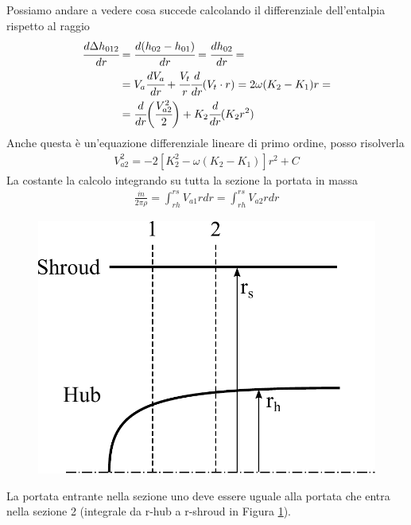 Possiamo andare a vedere cosa succede calcolando il differenziale dell'entalpia rispetto al raggio
\begin{align*}
\begin{split}
\cfrac{d \Delta h_{012}}{dr} &= \cfrac{d ( h_{02}-h_{01})}{dr} = \cfrac{dh_{02}}{dr} = \\
&= V_a \cfrac{dV_a}{dr} + \cfrac{V_t}{r} \cfrac{d}{dr} (V_t \cdot r) = 2 \omega (K_2 - K_1) r = \\
&= \cfrac{d}{dr} \bigg( \cfrac{V_{a2}^2}{2} \bigg) + K_2 \cfrac{d}{dr} (K_2 r^2)
\end{split}
\end{align*}
Anche questa è un'equazione differenziale lineare di primo ordine, posso risolverla
\begin{align*}
V_{a2}^2 = -2 \left[ K_2^2 - \omega \left( K_2 - K_1 \right) \right] r^2 + C
\end{align*}
La costante la calcolo integrando su tutta la sezione la portata in massa
\begin{align*}
\frac{\dot{m}}{2 \pi \rho} = \int_{rh}^{rs} V_{a1} r dr = \int_{rh}^{rs} V_{a2} r dr
\end{align*}
\begin{figure}[h]
\centering
  \includegraphics[width=.4\textwidth]{fig/HubShroud.pdf}
\caption{}
\label{fig:hubshroud}
\end{figure}
La portata entrante nella sezione uno deve essere uguale alla portata che entra nella sezione 2 (integrale da r-hub a r-shroud in Figura \ref{fig:hubshroud}).

